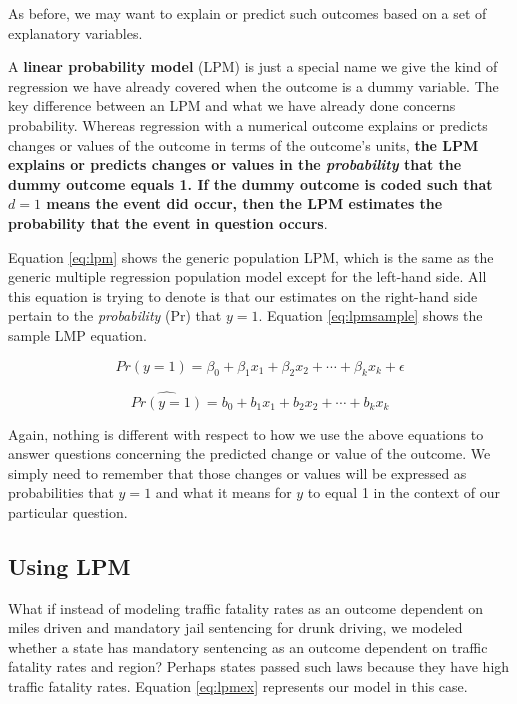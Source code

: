 \documentclass[
]{book}
\begin{document}
As before, we may want to explain or predict such outcomes based on a set of explanatory variables.

A \textbf{linear probability model} (LPM) is just a special name we give the kind of regression we have already covered when the outcome is a dummy variable. The key difference between an LPM and what we have already done concerns probability. Whereas regression with a numerical outcome explains or predicts changes or values of the outcome in terms of the outcome's units, \textbf{the LPM explains or predicts changes or values in the \emph{probability} that the dummy outcome equals 1. If the dummy outcome is coded such that \(d=1\) means the event did occur, then the LPM estimates the probability that the event in question occurs}.

Equation \eqref{eq:lpm} shows the generic population LPM, which is the same as the generic multiple regression population model except for the left-hand side. All this equation is trying to denote is that our estimates on the right-hand side pertain to the \emph{probability} (Pr) that \(y=1\). Equation \eqref{eq:lpmsample} shows the sample LMP equation.

\begin{equation}
Pr(y=1)=\beta_0+\beta_1x_1+\beta_2x_2+\cdots+\beta_kx_k+\epsilon
\label{eq:lpm}
\end{equation}

\begin{equation}
\hat{Pr(y=1)}=b_0+b_1x_1+b_2x_2+\cdots +b_kx_k
\label{eq:lpmsample}
\end{equation}

Again, nothing is different with respect to how we use the above equations to answer questions concerning the predicted change or value of the outcome. We simply need to remember that those changes or values will be expressed as probabilities that \(y=1\) and what it means for \(y\) to equal 1 in the context of our particular question.

\hypertarget{using-lpm}{%
\subsection{Using LPM}\label{using-lpm}}

What if instead of modeling traffic fatality rates as an outcome dependent on miles driven and mandatory jail sentencing for drunk driving, we modeled whether a state has mandatory sentencing as an outcome dependent on traffic fatality rates and region? Perhaps states passed such laws because they have high traffic fatality rates. Equation \eqref{eq:lpmex} represents our model in this case.
\end{document}
